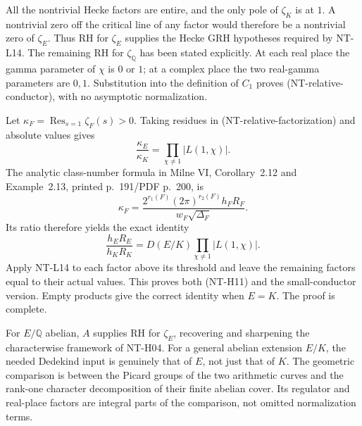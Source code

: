 All the nontrivial Hecke factors are entire, and the only pole
of $\zeta_K$ is at $1$.  A nontrivial zero off the critical
line of any factor would therefore be a nontrivial zero of
$\zeta_E$.  Thus RH for $\zeta_E$ supplies the Hecke GRH
hypotheses required by NT-L14.  The remaining RH for
$\zeta_{\mathbb Q}$ has been stated explicitly.
At each real place the gamma parameter of $\chi$ is $0$ or $1$;
at a complex place the two real-gamma parameters are $0,1$.
Substitution into the definition of $C_1$ proves
(NT-relative-conductor), with no asymptotic normalization.

Let $\kappa_F=\operatorname{Res}_{s=1}\zeta_F(s)>0$.
Taking residues in (NT-relative-factorization) and absolute
values gives
\[
 \frac{\kappa_E}{\kappa_K}
                  =\prod_{\chi\ne1}|L(1,\chi)|.
\]
The analytic class-number formula in Milne VI,
Corollary~2.12 and Example~2.13, printed p.~191/PDF p.~200,
is
\[
 \kappa_F=\frac{2^{r_1(F)}(2\pi)^{r_2(F)}h_FR_F}
                         {w_F\sqrt{\Delta_F}}.
\]
Its ratio therefore yields the exact identity
\[
 \frac{h_ER_E}{h_KR_K}
             =D(E/K)\prod_{\chi\ne1}|L(1,\chi)|.
\]
Apply NT-L14 to each factor above its threshold and leave the
remaining factors equal to their actual values.  This proves
both (NT-H11) and the small-conductor version.
Empty products give the correct identity when $E=K$.
The proof is complete.

For $E/\mathbb Q$ abelian, $A$ supplies RH for $\zeta_E$,
recovering and sharpening the characterwise framework of NT-H04.
For a general abelian extension $E/K$, the needed Dedekind
input is genuinely that of $E$, not just that of $K$.
The geometric comparison is between the Picard groups of the
two arithmetic curves and the rank-one character decomposition
of their finite abelian cover.  Its regulator and real-place
factors are integral parts of the comparison, not omitted
normalization terms.

